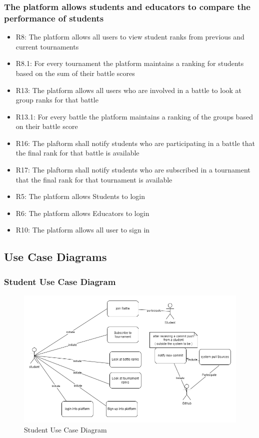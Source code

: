 \subsubsection{The platform allows students and educators to compare the performance of students}

\begin{itemize}
    \item R8: The platform allows all users to view student ranks from previous and current tournaments
    \item R8.1: For every tournament the platform maintains a ranking for students based on the sum of their battle scores
    \item R13: The platform allows all users who are involved in a battle to look at group ranks for that battle
    \item R13.1: For every battle the platform maintains a ranking of the groups based on their battle score
    \item R16: The plaftorm shall notify students who are participating in a battle that the final rank for that battle is available
    \item R17: The plaftorm shall notify students who are subscribed in a tournament that the final rank for that tournament is available
    \item R5: The platform allows Students to login
    \item R6: The platform allows Educators to login
    \item R10: The platform allows all user to sign in
    
\end{itemize}

\subsection{Use Case Diagrams}

\subsubsection{Student Use Case Diagram}
\begin{figure}[H]
    \centering
    \includegraphics[width=1\linewidth]{misc//Images//UC/StudentScenarios.png}
    \caption{Student Use Case Diagram}
    \label{fig:enter-label}
\end{figure}


